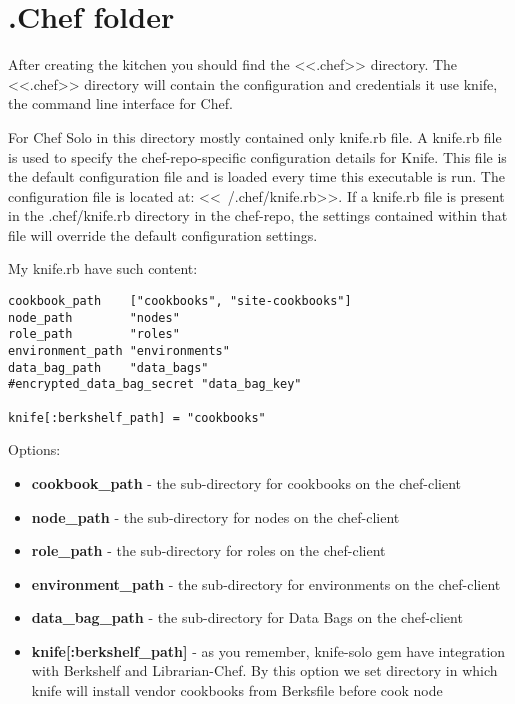 \section{.Chef folder}

After creating the kitchen you should find the <<.chef>> directory. The <<.chef>> directory will contain the configuration and credentials it use knife, the command line interface for Chef.

For Chef Solo in this directory mostly contained only knife.rb file. A knife.rb file is used to specify the chef-repo-specific configuration details for Knife. This file is the default configuration file and is loaded every time this executable is run. The configuration file is located at: <<~/.chef/knife.rb>>. If a knife.rb file is present in the .chef/knife.rb directory in the chef-repo, the settings contained within that file will override the default configuration settings.

My knife.rb have such content:

\begin{lstlisting}[label=lst:my-cloud-chef-filder1,title=my-cloud/.chef/knife.rb]
cookbook_path    ["cookbooks", "site-cookbooks"]
node_path        "nodes"
role_path        "roles"
environment_path "environments"
data_bag_path    "data_bags"
#encrypted_data_bag_secret "data_bag_key"

knife[:berkshelf_path] = "cookbooks"
\end{lstlisting}

Options:

\begin{itemize}
  \item \textbf{cookbook\_path} - the sub-directory for cookbooks on the chef-client
  \item \textbf{node\_path} - the sub-directory for nodes on the chef-client
  \item \textbf{role\_path} - the sub-directory for roles on the chef-client
  \item \textbf{environment\_path} - the sub-directory for environments on the chef-client
  \item \textbf{data\_bag\_path} - the sub-directory for Data Bags on the chef-client
  \item \textbf{knife[:berkshelf\_path]} - as you remember, knife-solo gem have integration with Berkshelf and Librarian-Chef. By this option we set directory in which knife will install vendor cookbooks from Berksfile before cook node
\end{itemize}